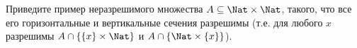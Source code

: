 Приведите пример неразрешимого множества $A \subseteq \Nat \times \Nat$, такого, что все его горизонтальные и вертикальные
сечения разрешимы (т.е. для любого $x$ разрешимы $A \cap \{\{x\} \times \Nat\}$ и $A \cap \{\Nat \times \{x\}\}$).